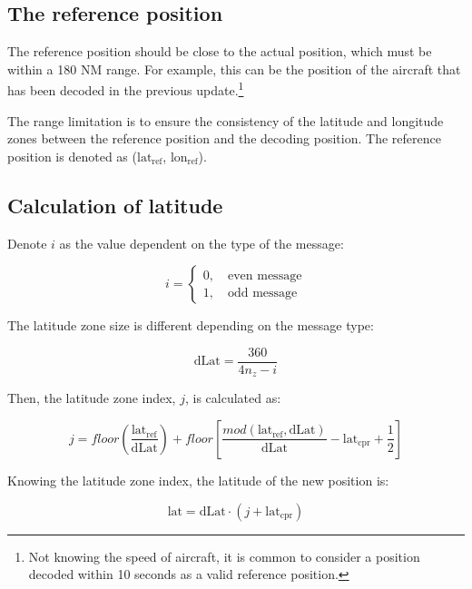\subsection{The reference position}

The reference position should be close to the actual position, which must be within a 180 NM range. For example, this can be the position of the aircraft that has been decoded in the previous update.\footnote{Not knowing the speed of aircraft, it is common to consider a position decoded within 10 seconds as a valid reference position.} 

The range limitation is to ensure the consistency of the latitude and longitude zones between the reference position and the decoding position. The reference position is denoted as ($\mathrm{lat}_\mathrm{ref}$, $\mathrm{lon}_\mathrm{ref}$).

\subsection{Calculation of latitude}

Denote $i$ as the value dependent on the type of the message:

\begin{equation}
  i =
  \begin{cases}
    0, \quad \text{even message} \\
    1, \quad \text{odd message}
  \end{cases}
\end{equation}

\noindent The latitude zone size is different depending on the message type:

\begin{equation}
  \mathrm{dLat} = \frac{360}{4n_z-i}
\end{equation}

Then, the latitude zone index, $j$, is calculated as:

\begin{equation}
  j = floor \left( \frac{\mathrm{lat}_\mathrm{ref}}{\mathrm{dLat}} \right) + floor \left[ \frac{mod(\mathrm{lat}_\mathrm{ref}, \mathrm{dLat})}{\mathrm{dLat}}  - \mathrm{lat}_\mathrm{cpr}  + \frac{1}{2} \right]
\end{equation}

Knowing the latitude zone index, the latitude of the new position is:

\begin{equation}
  \mathrm{lat} = \mathrm{dLat} \cdot (j + \mathrm{lat}_\mathrm{cpr})
\end{equation}


